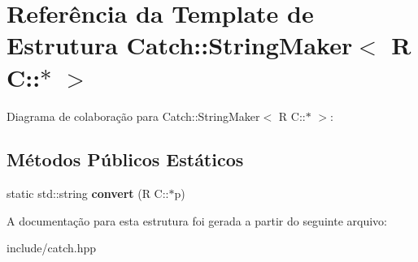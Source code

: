 \hypertarget{structCatch_1_1StringMaker_3_01R_01C_1_1_5_01_4}{}\section{Referência da Template de Estrutura Catch\+:\+:String\+Maker$<$ R C\+:\+:$\ast$ $>$}
\label{structCatch_1_1StringMaker_3_01R_01C_1_1_5_01_4}


Diagrama de colaboração para Catch\+:\+:String\+Maker$<$ R C\+:\+:$\ast$ $>$\+:
\subsection*{Métodos Públicos Estáticos}
\begin{DoxyCompactItemize}
\item 
static std\+::string {\bfseries convert} (R C\+::$\ast$p)\hypertarget{structCatch_1_1StringMaker_3_01R_01C_1_1_5_01_4_af69c15e0b406e945777137fe4a333731}{}\label{structCatch_1_1StringMaker_3_01R_01C_1_1_5_01_4_af69c15e0b406e945777137fe4a333731}

\end{DoxyCompactItemize}


A documentação para esta estrutura foi gerada a partir do seguinte arquivo\+:\begin{DoxyCompactItemize}
\item 
include/catch.\+hpp\end{DoxyCompactItemize}
